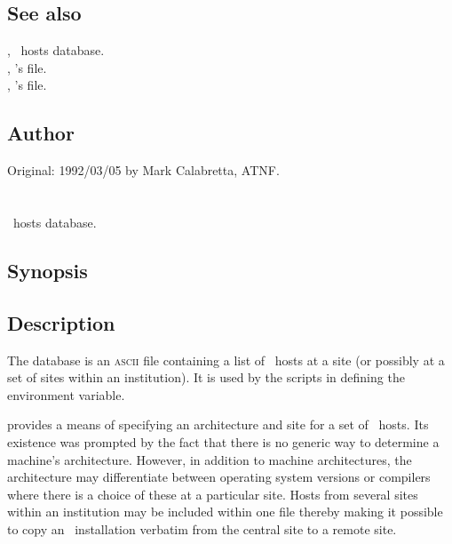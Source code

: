 \subsection*{See also}

, \aipspp\ hosts database.\\
, 's  file.\\
, 's  file.

\subsection*{Author}

Original: 1992/03/05 by Mark Calabretta, ATNF.


\newpage
\section{}
\label{aipshosts}

\aipspp\ hosts database.

\subsection*{Synopsis}

\begin{synopsis}
\end{synopsis}

\subsection*{Description}

The  database is an \textsc{ascii} file containing a list of
\aipspp\ hosts at a site (or possibly at a set of sites within an
institution).  It is used by the  scripts in
defining the  environment variable.

 provides a means of specifying an architecture and site for a
set of \aipspp\ hosts.  Its existence was prompted by the fact that there is
no generic way to determine a machine's architecture.  However, in addition to
machine architectures, the architecture may differentiate between operating
system versions or compilers where there is a choice of these at a particular
site.  Hosts from several sites within an institution may be included within
one  file thereby making it possible to copy an \aipspp\ 
installation verbatim from the central site to a remote site.

